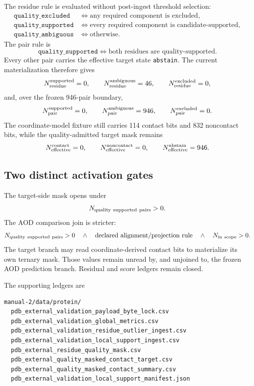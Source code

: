 The residue rule is evaluated without post-ingest threshold selection:
\[
\begin{aligned}
\texttt{quality\_excluded}
&\iff \text{any required component is excluded},\\
\texttt{quality\_supported}
&\iff \text{every required component is candidate-supported},\\
\texttt{quality\_ambiguous}
&\iff \text{otherwise}.
\end{aligned}
\]
The pair rule is
\[
\texttt{quality\_supported}
\iff
\text{both residues are quality-supported}.
\]
Every other pair carries the effective target state \texttt{abstain}.  The current materialization therefore gives
\[
N_{\rm residue}^{\rm supported}=0,
\qquad
N_{\rm residue}^{\rm ambiguous}=46,
\qquad
N_{\rm residue}^{\rm excluded}=0,
\]
and, over the frozen 946-pair boundary,
\[
N_{\rm pair}^{\rm supported}=0,
\qquad
N_{\rm pair}^{\rm ambiguous}=946,
\qquad
N_{\rm pair}^{\rm excluded}=0.
\]
The coordinate-model fixture still carries 114 contact bits and 832 noncontact bits, while the quality-admitted target mask remains
\[
N_{\rm effective}^{\rm contact}=0,
\qquad
N_{\rm effective}^{\rm noncontact}=0,
\qquad
N_{\rm effective}^{\rm abstain}=946.
\]

\subsection{Two distinct activation gates}

The target-side mask opens under
\[
N_{\rm quality\ supported\ pairs}>0.
\]
The AOD comparison join is stricter:
\[
N_{\rm quality\ supported\ pairs}>0
\quad\land\quad
\text{declared alignment/projection rule}
\quad\land\quad
N_{\rm in\ scope}>0.
\]
The target branch may read coordinate-derived contact bits to materialize its own ternary mask.  Those values remain unread by, and unjoined to, the frozen AOD prediction branch.  Residual and score ledgers remain closed.

The supporting ledgers are
\begin{verbatim}
manual-2/data/protein/
  pdb_external_validation_payload_byte_lock.csv
  pdb_external_validation_global_metrics.csv
  pdb_external_validation_residue_outlier_ingest.csv
  pdb_external_validation_local_support_ingest.csv
  pdb_external_residue_quality_mask.csv
  pdb_external_quality_masked_contact_target.csv
  pdb_external_quality_masked_contact_summary.csv
  pdb_external_validation_local_support_manifest.json
\end{verbatim}
